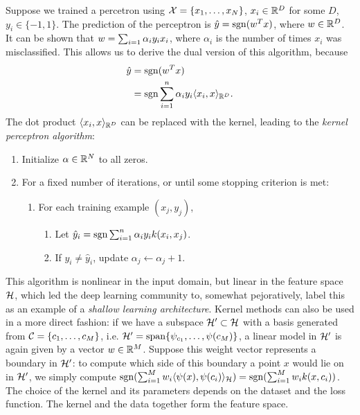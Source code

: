 Suppose we trained a percetron using $\mathcal{X}=\{x_1, \dots, x_{N}\}$, $x_i\in\mathbb{R}^D$ for some $D$, $y_i\in\{-1, 1\}$.
The prediction of the perceptron is $\hat{y}=\mathrm{sgn}(w^Tx)$, where $w\in\mathbb{R}^D$. It can be shown that 
$w=\sum_{i=1}\alpha_iy_ix_i$, where $\alpha_i$ is the number of times $x_i$ was misclassified. This allows us
to derive the dual version of this algorithm, because
\begin{align*}
 \hat{y} &= \mathrm{sgn}(w^Tx)\\
         &= \mathrm{sgn}\sum_{i=1}^n\alpha_iy_i\langle x_i, x\rangle_{\mathbb{R}^D}.
\end{align*}
The dot product $\langle x_i, x\rangle_{\mathbb{R}^D}$ can be replaced with the kernel, leading to the \emph{kernel perceptron algorithm}:
\begin{enumerate}
 \item Initialize $\alpha\in\mathbb{R}^{N}$ to all zeros. 
 \item For a fixed number of iterations, or until some stopping criterion is met:
       \begin{enumerate}
        \item For each training example $(x_j, y_j)$,
              \begin{enumerate}
               \item Let $\hat{y}_i=\mathrm{sgn}\sum_{i=1}^n\alpha_iy_ik(x_i, x_j)$.
               \item If $y_i\neq\hat{y}_i$, update $\alpha_j \leftarrow \alpha_j + 1$.
              \end{enumerate}
       \end{enumerate}
\end{enumerate}
This algorithm is nonlinear in the input domain, but linear in the feature space $\mathcal{H}$, which led the deep learning community to,
somewhat pejoratively, label this as an example of a \emph{shallow learning architecture}.
Kernel methods can also be used in a more direct fashion: if we have a subspace $\mathcal{H}'\subset\mathcal{H}$ with a basis generated
from $\mathcal{C} = \{c_1,\dots,c_{M}\}$, i.e. $\mathcal{H}' = \operatorname{span}\{\psi_{c_1},\dots,\psi(c_{M})\}$,
a linear model in $\mathcal{H}'$ is again given
by a vector $w\in\mathbb{R}^{M}$. Suppose this weight vector represents a boundary in $\mathcal{H}'$: 
to compute which side of this boundary a point $x$ would lie on in $\mathcal{H}'$,
we simply compute $\mathrm{sgn}(\sum_{i=1}^{M}w_i\langle\psi(x), \psi(c_i) \rangle_{\mathcal{H}}) = \mathrm{sgn}(\sum_{i=1}^{M}w_ik(x,c_i))$.
The choice of the kernel and its parameters
depends on the dataset and the loss function. The kernel and the data together form the feature space. 


